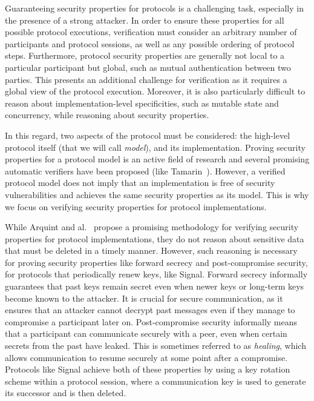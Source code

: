 Guaranteeing security properties for protocols is a challenging task, especially in the presence of a strong attacker.
In order to ensure these properties for all possible protocol executions, verification must consider an arbitrary number of participants and protocol sessions, as well as any possible ordering of protocol steps. Furthermore, protocol security properties are generally not local to a particular participant but global, such as mutual authentication between two parties. This presents an additional challenge for verification as it requires a global view of the protocol execution.
Moreover, it is also particularly difficult to reason about implementation-level specificities, such as mutable state and concurrency, while reasoning about security properties.

In this regard, two aspects of the protocol must be considered: the high-level protocol itself (that we will call \emph{model}), and its implementation. Proving security properties for a protocol model is an active field of research and several promising automatic verifiers have been proposed (like Tamarin~\cite{meier2013tamarin}). However, a verified protocol model does not imply that an implementation is free of security vulnerabilities and achieves the same security properties as its model. This is why we focus on verifying security properties for protocol implementations.

While Arquint and al.~\cite{ArquintSchwerhoffMehtaMueller23} propose a promising methodology for verifying security properties for protocol implementations, they do not reason about sensitive data that must be deleted in a timely manner.
However, such reasoning is necessary for proving security properties like forward secrecy and post-compromise security, for protocols that periodically renew keys, like Signal.
Forward secrecy informally guarantees that past keys remain secret even when newer keys or long-term keys become known to the attacker.
It is crucial for secure communication, as it ensures that an attacker cannot decrypt past messages even if they manage to compromise a participant later on.
Post-compromise security informally means that a participant can communicate securely with a peer, even when certain secrets from the past have leaked.
This is sometimes referred to as \emph{healing}, which allows communication to resume securely at some point after a compromise.
Protocols like Signal achieve both of these properties by using a key rotation scheme within a protocol session, where a communication key is used to generate its successor and is then deleted.

